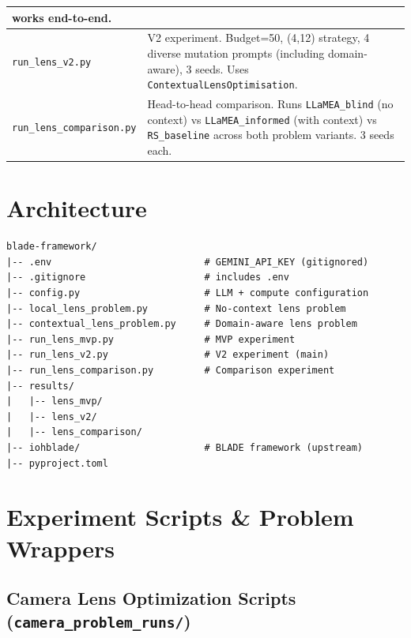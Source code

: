 \documentclass[a4paper,11pt]{article}
\begin{document}
\begin{longtable}{p{5.5cm} p{9cm}}
                              works end-to-end. \\
\midrule
\texttt{run\_lens\_v2.py} & V2 experiment. Budget=50, (4,12) strategy,
                             4 diverse mutation prompts (including
                             domain-aware), 3 seeds. Uses
                             \texttt{ContextualLensOptimisation}. \\
\midrule
\texttt{run\_lens\_comparison.py} & Head-to-head comparison. Runs
                                     \texttt{LLaMEA\_blind} (no context) vs
                                     \texttt{LLaMEA\_informed} (with context)
                                     vs \texttt{RS\_baseline} across both
                                     problem variants. 3 seeds each. \\
\bottomrule
\end{longtable}

\section{Architecture}

\begin{lstlisting}
blade-framework/
|-- .env                           # GEMINI_API_KEY (gitignored)
|-- .gitignore                     # includes .env
|-- config.py                      # LLM + compute configuration
|-- local_lens_problem.py          # No-context lens problem
|-- contextual_lens_problem.py     # Domain-aware lens problem
|-- run_lens_mvp.py                # MVP experiment
|-- run_lens_v2.py                 # V2 experiment (main)
|-- run_lens_comparison.py         # Comparison experiment
|-- results/
|   |-- lens_mvp/
|   |-- lens_v2/
|   |-- lens_comparison/
|-- iohblade/                      # BLADE framework (upstream)
|-- pyproject.toml
\end{lstlisting}

\section{Experiment Scripts \& Problem Wrappers}

\subsection{Camera Lens Optimization Scripts (\texttt{camera\_problem\_runs/})}
\end{document}
